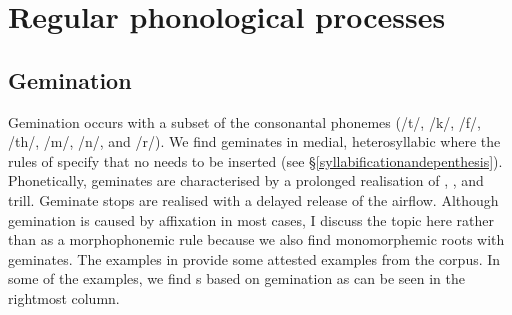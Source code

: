 
\section{Regular phonological processes} \label{regular-phon-processes}

\subsection{Gemination} \label{gemination-section}

Gemination occurs with a subset of the consonantal phonemes (/t/, /k/, /f/, /th/, /m/, /n/, and /r/). We find geminates in medial, heterosyllabic  where the rules of  specify that no  needs to be inserted (see \S{}\ref{syllabificationandepenthesis}). Phonetically, geminates are characterised by a prolonged realisation of , , and  trill. Geminate stops are realised with a delayed release of the airflow. Although gemination is caused by affixation in most cases, I discuss the topic here rather than as a morphophonemic rule because we also find monomorphemic roots with geminates. The examples in  provide some attested examples from the corpus. In some of the examples, we find s based on gemination as can be seen in the rightmost column.


